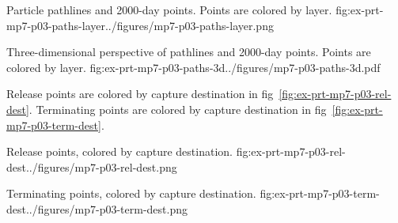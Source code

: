 \begin{StandardFigure}{
    Particle pathlines and 2000-day points. Points are colored by layer.
    }{fig:ex-prt-mp7-p03-paths-layer}{../figures/mp7-p03-paths-layer.png}
\end{StandardFigure}

\begin{StandardFigure}{
    Three-dimensional perspective of pathlines and 2000-day points. Points are colored by layer.
    }{fig:ex-prt-mp7-p03-paths-3d}{../figures/mp7-p03-paths-3d.pdf}
\end{StandardFigure}

Release points are colored by capture destination in fig~\ref{fig:ex-prt-mp7-p03-rel-dest}. Terminating points are colored by capture destination in fig~\ref{fig:ex-prt-mp7-p03-term-dest}.

\begin{StandardFigure}{
    Release points, colored by capture destination.
    }{fig:ex-prt-mp7-p03-rel-dest}{../figures/mp7-p03-rel-dest.png}
\end{StandardFigure}

\begin{StandardFigure}{
    Terminating points, colored by capture destination.
    }{fig:ex-prt-mp7-p03-term-dest}{../figures/mp7-p03-term-dest.png}
\end{StandardFigure}